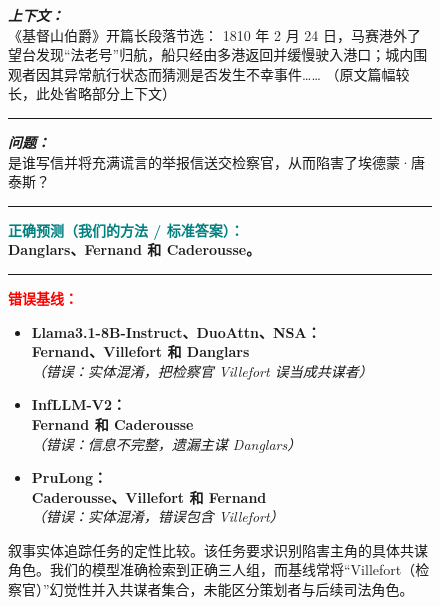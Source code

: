 \begin{figure}[ht]
\begin{AcademicBox}
\small
\setlength{\parindent}{0pt}

\textbf{\textit{上下文：}} \\
《基督山伯爵》开篇长段落节选：
1810 年 2 月 24 日，马赛港外了望台发现“法老号”归航，船只经由多港返回并缓慢驶入港口；城内围观者因其异常航行状态而猜测是否发生不幸事件……
（原文篇幅较长，此处省略部分上下文）
\vspace{4pt} \hrule \vspace{4pt}

\textbf{\textit{问题：}} \\
是谁写信并将充满谎言的举报信送交检察官，从而陷害了埃德蒙·唐泰斯？
\vspace{4pt} \hrule \vspace{4pt}

\textbf{\textcolor{teal}{正确预测（我们的方法 / 标准答案）：}} \hfill \textcolor{teal}{\checkmark} \\
\textbf{Danglars、Fernand 和 Caderousse。}
\vspace{4pt} \hrule \vspace{4pt}

\textbf{\textcolor{red}{错误基线：}} \\
\footnotesize
\begin{itemize}[leftmargin=*, label={}, itemsep=4pt, topsep=2pt]
 \item \textbf{Llama3.1-8B-Instruct、DuoAttn、NSA：} \\
 \textbf{Fernand、Villefort 和 Danglars} \\
    \textit{（错误：实体混淆，把检察官 Villefort 误当成共谋者）}

 \item \textbf{InfLLM-V2：} \\
 \textbf{Fernand 和 Caderousse} \\
    \textit{（错误：信息不完整，遗漏主谋 Danglars）}

 \item \textbf{PruLong：} \\
 \textbf{Caderousse、Villefort 和 Fernand} \\
    \textit{（错误：实体混淆，错误包含 Villefort）}

\end{itemize}

\end{AcademicBox}
\caption{叙事实体追踪任务的定性比较。该任务要求识别陷害主角的具体共谋角色。我们的模型准确检索到正确三人组，而基线常将“Villefort（检察官）”幻觉性并入共谋者集合，未能区分策划者与后续司法角色。}
\label{fig:case_montecristo}
\end{figure}
